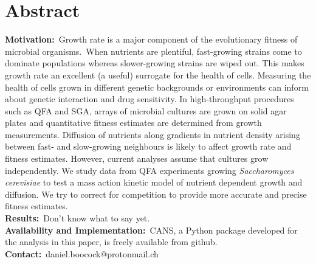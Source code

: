 \section*{Abstract}
\label{sec:abstract}

\textbf{Motivation:}~Growth rate is a major component of the
evolutionary fitness of microbial organisms.~When nutrients are
plentiful, fast-growing strains come to dominate populations whereas
slower-growing strains are wiped out. This makes growth rate an
excellent (a useful) surrogate for the health of cells. Measuring the
health of cells grown in different genetic backgrounds or environments
can inform about genetic interaction and drug sensitivity. In
high-throughput procedures such as QFA and SGA, arrays of microbial
cultures are grown on solid agar plates and quantitative fitness
estimates are determined from growth measurements. Diffusion of
nutrients along gradients in nutrient density arising between fast-
and slow-growing neighbours is likely to affect growth rate and
fitness estimates. However, current analyses assume that cultures grow
independently. We study data from QFA experiments growing
\textit{Saccharomyces cerevisiae} to test a mass action kinetic model
of nutrient dependent growth and diffusion. We try to correct for
competition to provide more accurate and precise fitness estimates.
\\
\textbf{Results:}~Don't know what to say yet.\\
\textbf{Availability and Implementation:}~CANS, a Python package
developed for the analysis in this paper, is freely available from
github.
\\
\textbf{Contact:}~daniel.boocock@protonmail.ch\\

